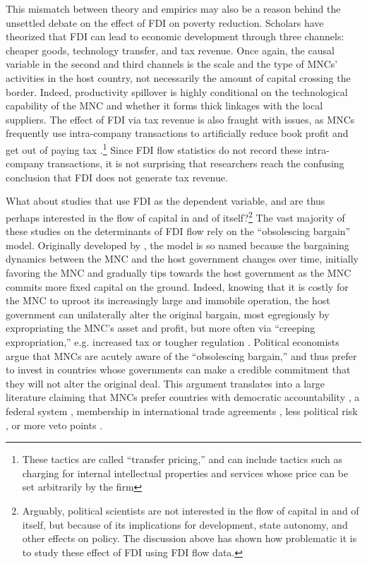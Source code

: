 This mismatch between theory and empirics may also be a reason behind the
unsettled debate on the effect of FDI on poverty reduction. Scholars have
theorized that FDI can lead to economic development through three channels:
cheaper goods, technology transfer, and tax revenue. Once again, the causal
variable in the second and third channels is the scale and the type of MNCs'
activities in the host country, not necessarily the amount of capital crossing
the border. Indeed, productivity spillover is highly conditional on the
technological capability of the MNC and whether it forms thick linkages with the
local suppliers. The effect of FDI via tax revenue is also fraught with issues,
as MNCs frequently use intra-company transactions to artificially reduce book
profit and get out of paying tax \citep{Malesky2015c}.\footnote{These tactics
  are called ``transfer pricing,'' and can include tactics such as charging for
  internal intellectual properties and services whose price can be set
  arbitrarily by the firm} Since FDI flow statistics do not record these
intra-company transactions, it is not surprising that researchers reach the
confusing conclusion that FDI does not generate tax revenue.

What about studies that use FDI as the dependent variable, and are thus perhaps
interested in the flow of capital in and of itself?\footnote{Arguably, political
  scientists are not interested in the flow of capital in and of itself, but
  because of its implications for development, state autonomy, and other effects
  on policy. The discussion above has shown how problematic it is to study these
  effect of FDI using FDI flow data.} The vast majority of these studies on the
determinants of FDI flow rely on the ``obsolescing bargain'' model. Originally
developed by \citet{Vernon1971}, the model is so named because the bargaining
dynamics between the MNC and the host government changes over time, initially
favoring the MNC and gradually tips towards the host government as the MNC
commits more fixed capital on the ground. Indeed, knowing that it is costly for
the MNC to uproot its increasingly large and immobile operation, the host
government can unilaterally alter the original bargain, most egregiously by
expropriating the MNC's asset and profit, but more often via ``creeping
expropriation,'' e.g. increased tax or tougher regulation \citep{Li2009a}.
Political economists argue that MNCs are acutely aware of the ``obsolescing
bargain,'' and thus prefer to invest in countries whose governments can make a
credible commitment that they will not alter the original deal. This argument
translates into a large literature claiming that MNCs prefer countries with
democratic accountability \citep{Jensen2003}, a federal system
\citep{Jensen2005}, membership in international trade agreements
\citep{Buthe2008}, less political risk \citep{Beazer2011, Graham2010}, or more
veto points \citep{Choi2008}.

